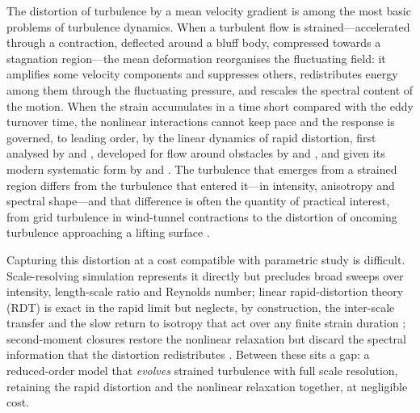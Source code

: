 \documentclass[lineno]{JFM-FLM_Au}
\providecommand{\DIFdelend}{} %
\begin{document}
\DIFdelend The distortion of turbulence by a mean velocity gradient is among the
most basic problems of turbulence dynamics. When a turbulent flow is
strained---accelerated through a contraction, deflected around a bluff
body, compressed towards a stagnation region---the mean deformation
reorganises the fluctuating field: it amplifies some velocity components
and suppresses others, redistributes energy among them through the
fluctuating pressure, and rescales the spectral content of the motion.
When the strain accumulates in a time short compared with the eddy
turnover time, the nonlinear interactions cannot keep pace and the
response is governed, to leading order, by the linear dynamics of rapid
distortion, first analysed by \citet{BatchelorProudman1954} and
\citet{TownsendBook1976}, developed for flow around obstacles by
\citet{Hunt1973} and \citet{HuntGraham1978}, and given its modern
systematic form by \citet{HuntCarruthers1990} and
\citet{SagautCambon2018}. The turbulence that emerges from a strained
region differs from the turbulence that entered it---in intensity,
anisotropy and spectral shape---and that difference is often the
quantity of practical interest, from grid turbulence in wind-tunnel
contractions \citep{MillsCorrsin1959,TuckerReynolds1968,LeeReynolds1985}
to the distortion of oncoming turbulence approaching a lifting surface
\citep{HuntGraham1978,GoldsteinAtassi1976}.

Capturing this distortion at a cost compatible with parametric study is
difficult. Scale-resolving simulation represents it directly but
precludes broad sweeps over intensity, length-scale ratio and Reynolds
number; linear rapid-distortion theory (RDT) is exact in the rapid limit
but neglects, by construction, the inter-scale transfer and the slow
return to isotropy that act over any finite strain duration
\citep{SagautCambon2018}; second-moment closures restore the nonlinear
relaxation but discard the spectral information that the distortion
redistributes \citep{LaunderReeceRodi1975,Pope2000}. Between these sits
a gap: a reduced-order model that \emph{evolves} strained turbulence
with full scale resolution, retaining the rapid distortion and the
nonlinear relaxation together, at negligible cost.
\end{document}
